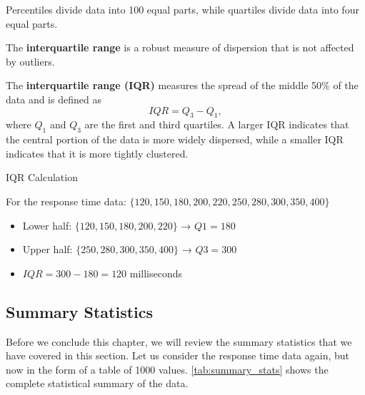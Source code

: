 Percentiles divide data into 100 equal parts, while quartiles divide data into four equal parts.

The \textbf{interquartile range} is a robust measure of dispersion that is not affected by outliers.

\begin{definition}
    The \textbf{interquartile range (IQR)} measures the spread of the middle 50\% of the data and is defined as
    $$
    IQR = Q_3 - Q_1,
    $$
    where $Q_1$ and $Q_3$ are the first and third quartiles. A larger IQR indicates that the central portion of the data is more widely dispersed, while a smaller IQR indicates that it is more tightly clustered.
\end{definition}
    

\begin{example} IQR Calculation

For the response time data: $\{120, 150, 180, 200, 220, 250, 280, 300, 350, 400\}$

\begin{itemize}
    \item Lower half: $\{120, 150, 180, 200, 220\}$ → $Q1 = 180$
    \item Upper half: $\{250, 280, 300, 350, 400\}$ → $Q3 = 300$
    \item $IQR = 300 - 180 = 120$ milliseconds
\end{itemize}
\end{example}


\subsection*{Summary Statistics}

Before we conclude this chapter, we will review the summary statistics that we have covered in this section. Let us consider the response time data again, but now in the form of a table of 1000 values. \autoref{tab:summary_stats} shows the complete statistical summary of the data.


